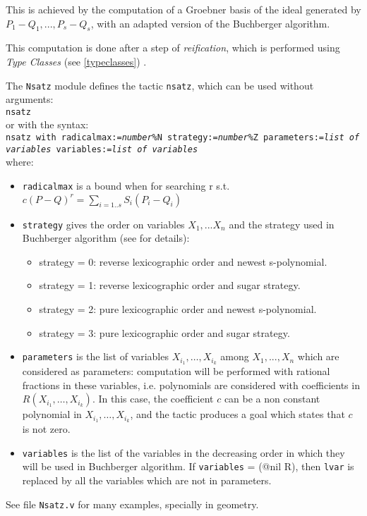 This is achieved by the computation of a Groebner basis of the
ideal generated by $P_1-Q_1,...,P_s-Q_s$, with an adapted version of the Buchberger
algorithm.

This computation is done after a step of {\em reification}, which is
performed using {\em Type Classes} 
(see \ref{typeclasses})
.

The \texttt{Nsatz} module defines the tactic
\texttt{nsatz}, which can be used without arguments: \\
\vspace*{3mm}
\texttt{nsatz}\\
or with the syntax: \\
\vspace*{3mm}
\texttt{nsatz with radicalmax:={\em number}\%N strategy:={\em number}\%Z parameters:={\em list of variables} variables:={\em list of variables}}\\
where:

\begin{itemize}
    \item \texttt{radicalmax} is a bound when for searching r s.t.$c (P-Q)^r =
\sum_{i=1..s} S_i (P_i - Q_i)$
	
    \item \texttt{strategy} gives the order on variables $X_1,...X_n$ and
the strategy used in Buchberger algorithm (see
\cite{sugar} for details): 

     	\begin{itemize}
		\item  strategy = 0: reverse lexicographic order and newest s-polynomial.
		\item   strategy = 1: reverse lexicographic order and sugar strategy.
	        \item  strategy = 2: pure lexicographic order and newest s-polynomial.
	        \item   strategy = 3: pure lexicographic order and sugar strategy.
	\end{itemize}

	\item \texttt{parameters} is the list of variables
$X_{i_1},\ldots,X_{i_k}$  among $X_1,...,X_n$ which are considered as
   parameters: computation will be performed with rational fractions in these
   variables, i.e. polynomials are considered with coefficients in
$R(X_{i_1},\ldots,X_{i_k})$. In this case, the coefficient $c$ can be a non
constant polynomial in $X_{i_1},\ldots,X_{i_k}$, and the tactic produces a goal
which states that $c$ is not zero.

	\item \texttt{variables} is the list of the variables
in the decreasing order in which they will be used in Buchberger algorithm. If \texttt{variables} = {(@nil
R)}, then \texttt{lvar} is replaced by all the variables which are not in
parameters.

\end{itemize}

See file \texttt{Nsatz.v} for many examples, specially in geometry.


